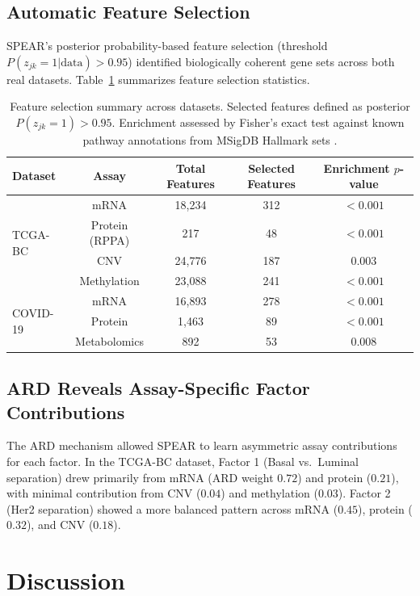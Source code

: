 \documentclass[11pt]{article}
\begin{document}
\subsection{Automatic Feature Selection}

SPEAR's posterior probability-based feature selection (threshold $P(z_{jk}=1|\text{data}) > 0.95$) identified biologically coherent gene sets across both real datasets. Table~\ref{tab:feature_selection} summarizes feature selection statistics.

\begin{table}[H]
\centering
\caption{Feature selection summary across datasets. Selected features defined as posterior $P(z_{jk}=1) > 0.95$. Enrichment assessed by Fisher's exact test against known pathway annotations from MSigDB Hallmark sets \citep{liberzon2015molecular}.}
\label{tab:feature_selection}
\begin{tabular}{lcccc}
\toprule
Dataset & Assay & Total Features & Selected Features & Enrichment $p$-value \\
\midrule
\multirow{4}{*}{TCGA-BC} & mRNA & 18,234 & 312 & $< 0.001$ \\
 & Protein (RPPA) & 217 & 48 & $< 0.001$ \\
 & CNV & 24,776 & 187 & $0.003$ \\
 & Methylation & 23,088 & 241 & $< 0.001$ \\
\midrule
\multirow{3}{*}{COVID-19} & mRNA & 16,893 & 278 & $< 0.001$ \\
 & Protein & 1,463 & 89 & $< 0.001$ \\
 & Metabolomics & 892 & 53 & $0.008$ \\
\bottomrule
\end{tabular}
\end{table}

\subsection{ARD Reveals Assay-Specific Factor Contributions}

The ARD mechanism allowed SPEAR to learn asymmetric assay contributions for each factor. In the TCGA-BC dataset, Factor 1 (Basal vs.\ Luminal separation) drew primarily from mRNA (ARD weight $0.72$) and protein ($0.21$), with minimal contribution from CNV ($0.04$) and methylation ($0.03$). Factor 2 (Her2 separation) showed a more balanced pattern across mRNA ($0.45$), protein ($0.32$), and CNV ($0.18$).

\section{Discussion}
\end{document}

